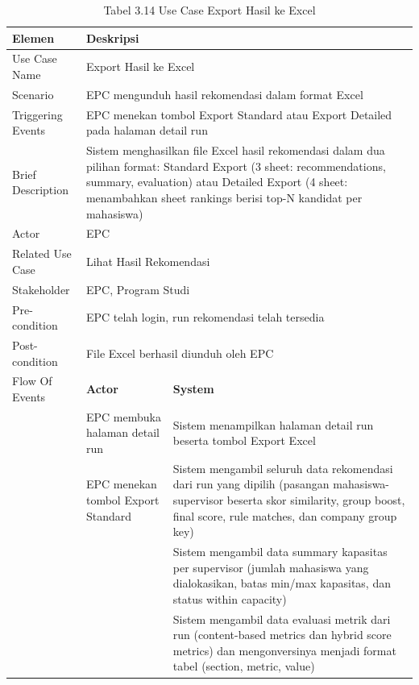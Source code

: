 \begin{longtable}{|p{3.5cm}|p{4.5cm}|p{5cm}|}
\caption{Tabel 3.14 Use Case Export Hasil ke Excel} \label{table:tab3.14} \\
\hline
\textbf{Elemen} & \multicolumn{2}{p{\ucdeskcol}|}{\textbf{Deskripsi}} \\
\hline
\endfirsthead
\endhead
\hline
\endfoot
Use Case Name & \multicolumn{2}{p{\ucdeskcol}|}{Export Hasil ke Excel} \\
\hline
Scenario & \multicolumn{2}{p{\ucdeskcol}|}{EPC mengunduh hasil rekomendasi dalam format Excel} \\
\hline
Triggering Events & \multicolumn{2}{p{\ucdeskcol}|}{EPC menekan tombol Export Standard atau Export Detailed pada halaman detail run} \\
\hline
Brief Description & \multicolumn{2}{p{\ucdeskcol}|}{Sistem menghasilkan file Excel hasil rekomendasi dalam dua pilihan format: Standard Export (3 sheet: recommendations, summary, evaluation) atau Detailed Export (4 sheet: menambahkan sheet rankings berisi top-N kandidat per mahasiswa)} \\
\hline
Actor & \multicolumn{2}{p{\ucdeskcol}|}{EPC} \\
\hline
Related Use Case & \multicolumn{2}{p{\ucdeskcol}|}{Lihat Hasil Rekomendasi} \\
\hline
Stakeholder & \multicolumn{2}{p{\ucdeskcol}|}{EPC, Program Studi} \\
\hline
Pre-condition & \multicolumn{2}{p{\ucdeskcol}|}{EPC telah login, run rekomendasi telah tersedia} \\
\hline
Post-condition & \multicolumn{2}{p{\ucdeskcol}|}{File Excel berhasil diunduh oleh EPC} \\
\hline
Flow Of Events & \textbf{Actor} & \textbf{System} \\
\hline
 & EPC membuka halaman detail run & Sistem menampilkan halaman detail run beserta tombol Export Excel \\
\hline
 & EPC menekan tombol Export Standard & Sistem mengambil seluruh data rekomendasi dari run yang dipilih (pasangan mahasiswa-supervisor beserta skor similarity, group boost, final score, rule matches, dan company group key) \\
\hline
 & & Sistem mengambil data summary kapasitas per supervisor (jumlah mahasiswa yang dialokasikan, batas min/max kapasitas, dan status within capacity) \\
\hline
 & & Sistem mengambil data evaluasi metrik dari run (content-based metrics dan hybrid score metrics) dan mengonversinya menjadi format tabel (section, metric, value) \\

\end{longtable}
